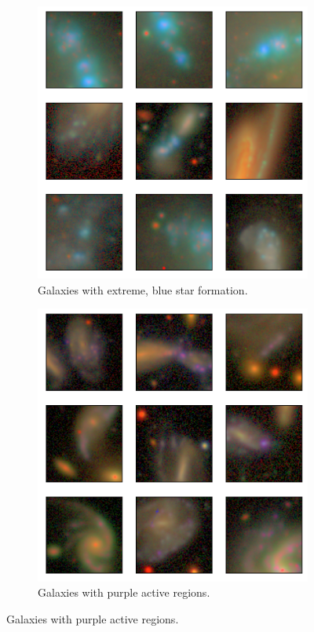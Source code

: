 \begin{figure}
\centering
\vspace{0cm}
\begin{subfigure}{.45\textwidth}
  \centering
  \includegraphics[width=0.8\linewidth]{anomalies_bluesf}  
  \caption{Galaxies with extreme, blue star formation.}
  \label{fig:anom_bluesf}
\end{subfigure}
\hspace{2em}
\begin{subfigure}{.45\textwidth}
  \centering
  \includegraphics[width=0.8\linewidth]{anomalies_purple}  
  \caption{Galaxies with purple active regions.}
  \label{fig:anom_purple}
\end{subfigure}
\vspace{1em}


\end{figure}
